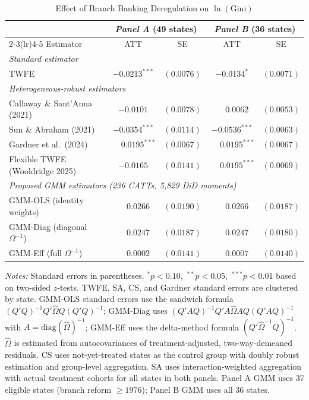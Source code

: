 \begin{table}[htbp]
\centering
\caption{Effect of Branch Banking Deregulation on $\ln(\text{Gini})$}
\label{tab:beck_results}
\begin{threeparttable}
\begin{tabular}{lcccc}
\toprule
 & \multicolumn{2}{c}{\textit{Panel A} (49 states)}
 & \multicolumn{2}{c}{\textit{Panel B} (36 states)} \\
\cmidrule(lr){2-3}\cmidrule(lr){4-5}
Estimator & ATT & SE & ATT & SE \\
\midrule
\multicolumn{5}{l}{\textit{Standard estimator}} \\[2pt]
TWFE
  & $-0.0213^{***}$ & $(0.0076)$
  & $-0.0134^{*}$   & $(0.0071)$ \\[4pt]
\multicolumn{5}{l}{\textit{Heterogeneous-robust estimators}} \\[2pt]
Callaway \& Sant'Anna (2021)
  & $-0.0101$       & $(0.0078)$
  & $\phantom{-}0.0062$  & $(0.0053)$ \\
Sun \& Abraham (2021)
  & $-0.0354^{***}$ & $(0.0114)$
  & $-0.0536^{***}$ & $(0.0063)$ \\
Gardner et al.\ (2024)
  & $\phantom{-}0.0195^{***}$ & $(0.0067)$
  & $\phantom{-}0.0195^{***}$ & $(0.0067)$ \\
Flexible TWFE (Wooldridge 2025)
  & $-0.0165$       & $(0.0141)$
  & $\phantom{-}0.0195^{***}$ & $(0.0069)$ \\[4pt]
\multicolumn{5}{l}{\textit{Proposed GMM estimators (236 CATTs, 5{,}829 DiD moments)}} \\[2pt]
GMM-OLS (identity weights)
  & $\phantom{-}0.0266$       & $(0.0190)$
  & $\phantom{-}0.0266$       & $(0.0187)$ \\
GMM-Diag (diagonal $\Omega^{-1}$)
  & $\phantom{-}0.0247$       & $(0.0187)$
  & $\phantom{-}0.0247$       & $(0.0180)$ \\
GMM-Eff (full $\Omega^{-1}$)
  & $\phantom{-}0.0002$       & $(0.0141)$
  & $\phantom{-}0.0007$       & $(0.0140)$ \\
\bottomrule
\end{tabular}
\begin{tablenotes}[flushleft]\small
\item \textit{Notes:} Standard errors in parentheses.
  $^{*}p<0.10$,\ $^{**}p<0.05$,\ $^{***}p<0.01$ based on two-sided $z$-tests.
  TWFE, SA, CS, and Gardner standard errors are clustered by state.
  GMM-OLS standard errors use the sandwich formula
  $(Q'Q)^{-1}Q'\hat{\Omega}Q(Q'Q)^{-1}$;
  GMM-Diag uses $(Q'AQ)^{-1}Q'A\hat{\Omega}AQ(Q'AQ)^{-1}$
  with $A = \mathrm{diag}(\hat{\Omega})^{-1}$;
  GMM-Eff uses the delta-method formula $(Q'\hat{\Omega}^{-1}Q)^{-1}$.
  $\hat{\Omega}$ is estimated from autocovariances of
  treatment-adjusted, two-way-demeaned residuals.
  CS uses not-yet-treated states as the control group with doubly robust
  estimation and group-level aggregation.
  SA uses interaction-weighted aggregation with actual treatment cohorts
  for all states in both panels.
  Panel A GMM uses 37 eligible states (branch reform $\geq 1976$);
  Panel B GMM uses all 36 states.
\end{tablenotes}
\end{threeparttable}
\end{table}
